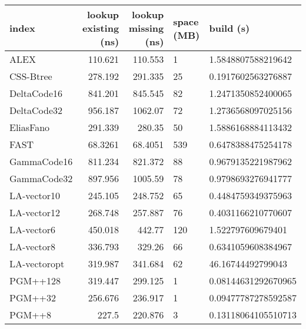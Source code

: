 \begin{tabular}{lrrll}
\hline
 index             &   lookup existing (ns) &   lookup missing (ns) & space (MB)   & build (s)             \\
\hline
 ALEX              &               110.621  &              110.553  & 1            & 1.5848807588219642    \\
 CSS-Btree         &               278.192  &              291.335  & 25           & 0.1917602563276887    \\
 DeltaCode16       &               841.201  &              845.545  & 82           & 1.2471350852400065    \\
 DeltaCode32       &               956.187  &             1062.07   & 72           & 1.2736568097025156    \\
 EliasFano         &               291.339  &              280.35   & 50           & 1.5886168884113432    \\
 FAST              &                68.3261 &               68.4051 & 539          & 0.6478388475254178    \\
 GammaCode16       &               811.234  &              821.372  & 88           & 0.9679135221987962    \\
 GammaCode32       &               897.956  &             1005.59   & 78           & 0.9798693276941777    \\
 LA-vector10       &               245.105  &              248.752  & 65           & 0.4484759349375963    \\
 LA-vector12       &               268.748  &              257.887  & 76           & 0.4031166210770607    \\
 LA-vector6        &               450.018  &              442.77   & 120          & 1.522797609679401     \\
 LA-vector8        &               336.793  &              329.26   & 66           & 0.6341059608384967    \\
 LA-vectoropt      &               319.987  &              341.684  & 62           & 46.16744492799043     \\
 PGM++128          &               319.447  &              299.125  & 1            & 0.08144631292670965   \\
 PGM++32           &               256.676  &              236.917  & 1            & 0.09477787278592587   \\
 PGM++8            &               227.5    &              220.876  & 3            & 0.13118064105510713   \\

\end{tabular}
